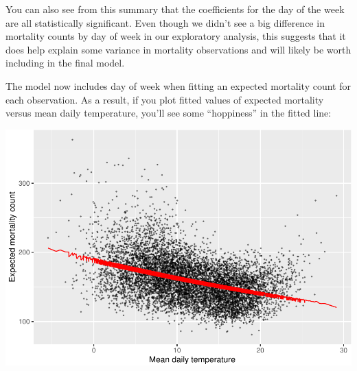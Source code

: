 \documentclass[
]{book}
\newenvironment{Shaded}{\begin{snugshade}}{\end{snugshade}}
\newcommand{\DataTypeTok}[1]{\textcolor[rgb]{0.13,0.29,0.53}{#1}}
\newcommand{\FloatTok}[1]{\textcolor[rgb]{0.00,0.00,0.81}{#1}}
\newcommand{\KeywordTok}[1]{\textcolor[rgb]{0.13,0.29,0.53}{\textbf{#1}}}
\newcommand{\NormalTok}[1]{#1}
\newcommand{\OperatorTok}[1]{\textcolor[rgb]{0.81,0.36,0.00}{\textbf{#1}}}
\newcommand{\StringTok}[1]{\textcolor[rgb]{0.31,0.60,0.02}{#1}}
\begin{document}
You can also see from this summary that the coefficients for the day of the
week are all statistically significant. Even though we didn't see a big
difference in mortality counts by day of week in our exploratory analysis,
this suggests that it does help explain some variance in mortality observations
and will likely be worth including in the final model.

The model now includes day of week when fitting an expected mortality count
for each observation. As a result, if you plot fitted values of expected
mortality versus mean daily temperature, you'll see some ``hoppiness'' in the
fitted line:

\begin{Shaded}
\end{Shaded}

\includegraphics{adv_epi_analysis_files/figure-latex/unnamed-chunk-40-1.pdf}
\end{document}

